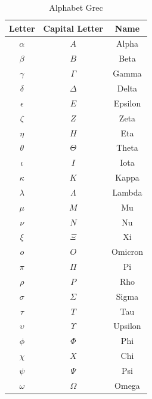 \documentclass[french,course,oneside,theoremnosection]{lecture}
\begin{document}
\begin{table}\centering
\begin{tabular}{ccc}
  \hline
  Letter & Capital Letter & Name \\
  \hline
  $\alpha$ & $A$ & Alpha \\
  $\beta$ & $B$ & Beta \\
  $\gamma$ & $\Gamma$ & Gamma \\
  $\delta$ & $\Delta$ & Delta \\
  $\epsilon$ & $E$ & Epsilon \\
  $\zeta$ & $Z$ & Zeta \\
  $\eta$ & $H$ & Eta \\
  $\theta$ & $\Theta$ & Theta \\
  $\iota$ & $I$ & Iota \\
  $\kappa$ & $K$ & Kappa \\
  $\lambda$ & $\Lambda$ & Lambda \\
  $\mu$ & $M$ & Mu \\
  $\nu$ & $N$ & Nu \\
  $\xi$ & $\Xi$ & Xi \\
  $o$ & $O$ & Omicron \\
  $\pi$ & $\Pi$ & Pi \\
  $\rho$ & $P$ & Rho \\
  $\sigma$ & $\Sigma$ & Sigma \\
  $\tau$ & $T$ & Tau \\
  $\upsilon$ & $\Upsilon$ & Upsilon \\
  $\phi$ & $\Phi$ & Phi \\
  $\chi$ & $X$ & Chi \\
  $\psi$ & $\Psi$ & Psi \\
  $\omega$ & $\Omega$ & Omega \\
  \hline
\end{tabular}
\caption{Alphabet Grec}\label{fig:grec}
\end{table}
\end{document}
